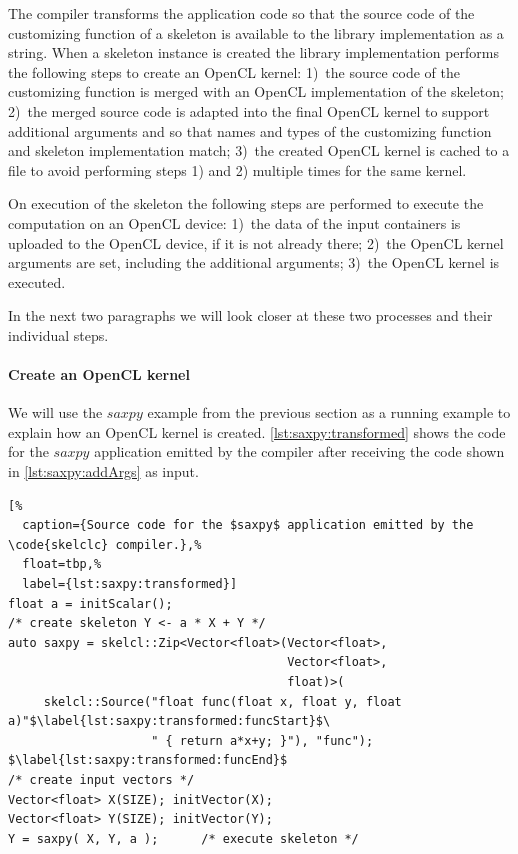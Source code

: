 The  compiler transforms the \SkelCL application code so that the source code of the customizing function of a skeleton is available to the \SkelCL library implementation as a string.
When a skeleton instance is created the \SkelCL library implementation performs the following steps to create an OpenCL kernel:
1)~the source code of the customizing function is merged with an OpenCL implementation of the skeleton;
2)~the merged source code is adapted into the final OpenCL kernel to support additional arguments and so that names and types of the customizing function and skeleton implementation match;
3)~the created OpenCL kernel is cached to a file to avoid performing steps 1) and 2) multiple times for the same kernel.

On execution of the skeleton the following steps are performed to execute the computation on an OpenCL device:
1)~the data of the input containers is uploaded to the OpenCL device, if it is not already there;
2)~the OpenCL kernel arguments are set, including the additional arguments;
3)~the OpenCL kernel is executed.

In the next two paragraphs we will look closer at these two processes and their individual steps.

\paragraph{Create an OpenCL kernel}
We will use the $saxpy$ example from the previous section as a running example to explain how an OpenCL kernel is created.
\autoref{lst:saxpy:transformed} shows the code for the $saxpy$ application emitted by the  compiler after receiving the code shown in \autoref{lst:saxpy:addArgs} as input.
\begin{lstlisting}[%
  caption={Source code for the $saxpy$ application emitted by the \code{skelclc} compiler.},%
  float=tbp,%
  label={lst:saxpy:transformed}]
float a = initScalar();
/* create skeleton Y <- a * X + Y */
auto saxpy = skelcl::Zip<Vector<float>(Vector<float>,
                                       Vector<float>,
                                       float)>(
     skelcl::Source("float func(float x, float y, float a)"$\label{lst:saxpy:transformed:funcStart}$\
                    " { return a*x+y; }"), "func"); $\label{lst:saxpy:transformed:funcEnd}$
/* create input vectors */
Vector<float> X(SIZE); initVector(X);
Vector<float> Y(SIZE); initVector(Y);
Y = saxpy( X, Y, a );      /* execute skeleton */
\end{lstlisting}

